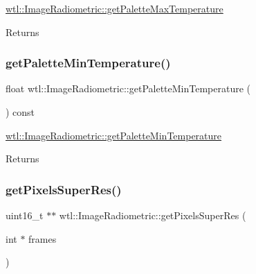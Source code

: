 \hyperlink{classwtl_1_1_image_radiometric_afaa9e2ee77818d64c856f941ac3c26a3}{wtl\+::\+Image\+Radiometric\+::get\+Palette\+Max\+Temperature} 

\begin{DoxyReturn}{Returns}

\end{DoxyReturn}
\mbox{\label{classwtl_1_1_image_radiometric_a8e604d89775064734e7d09bdf0ddb868}} 
\subsubsection{\texorpdfstring{get\+Palette\+Min\+Temperature()}{getPaletteMinTemperature()}}
{\footnotesize\ttfamily float wtl\+::\+Image\+Radiometric\+::get\+Palette\+Min\+Temperature (\begin{DoxyParamCaption}{ }\end{DoxyParamCaption}) const}



\hyperlink{classwtl_1_1_image_radiometric_a8e604d89775064734e7d09bdf0ddb868}{wtl\+::\+Image\+Radiometric\+::get\+Palette\+Min\+Temperature} 

\begin{DoxyReturn}{Returns}

\end{DoxyReturn}
\mbox{\label{classwtl_1_1_image_radiometric_a06ac3d38bbf4a8b705398c690fee7532}} 
\subsubsection{\texorpdfstring{get\+Pixels\+Super\+Res()}{getPixelsSuperRes()}}
{\footnotesize\ttfamily uint16\+\_\+t $\ast$$\ast$ wtl\+::\+Image\+Radiometric\+::get\+Pixels\+Super\+Res (\begin{DoxyParamCaption}\item[{int $\ast$}]{frames }\end{DoxyParamCaption})}



